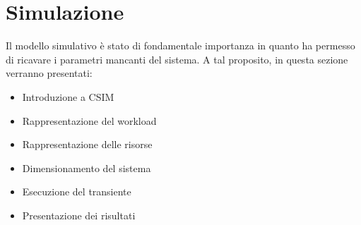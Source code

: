 \chapter{Simulazione}
Il modello simulativo è stato di fondamentale importanza in quanto ha permesso di ricavare i parametri mancanti del sistema. A tal proposito, in questa sezione verranno presentati:
\begin{itemize}
	\item Introduzione a CSIM
	\item Rappresentazione del workload
	\item Rappresentazione delle risorse
	\item Dimensionamento del sistema
	\item Esecuzione del transiente
	\item Presentazione dei risultati
\end{itemize}

